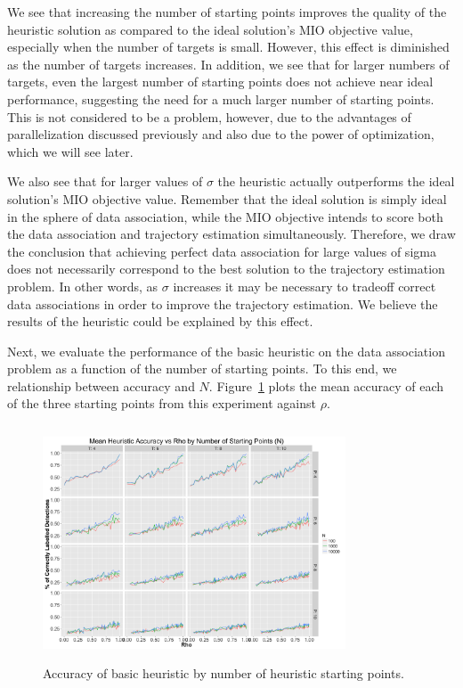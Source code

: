 \documentclass[journal]{IEEEtran}
\begin{document}
We see that increasing the number of starting points improves the quality of the heuristic solution as compared to the ideal solution's MIO objective value, especially when the number of targets is small. However, this effect is diminished as the number of targets increases. In addition, we see that for larger numbers of targets, even the largest number of starting points does not achieve near ideal performance, suggesting the need for a much larger number of starting points. This is not considered to be a problem, however, due to the advantages of parallelization discussed previously and also due to the power of optimization, which we will see later. 

We also see that for larger values of $\sigma$ the heuristic actually outperforms the ideal solution's MIO objective value. Remember that the ideal solution is simply ideal in the sphere of data association, while the MIO objective intends to score both the data association and trajectory estimation simultaneously. Therefore, we draw the conclusion that achieving perfect data association for large values of sigma does not necessarily correspond to the best solution to the trajectory estimation problem. In other words, as $\sigma$ increases it may be necessary to tradeoff correct data associations in order to improve the trajectory estimation. We believe the results of the heuristic could be explained by this effect.

Next, we evaluate the performance of the basic heuristic on the data association problem as a function of the number of starting points. To this end, we relationship between accuracy and $N$. Figure~\ref{fig:Basic_Heuristic_Accuracy} plots the mean accuracy of each of the three starting points from this experiment against $\rho$. 

\begin{figure}[h]
  \centering
  \includegraphics[width=9cm, height=7cm]{Basic_Heuristic_Accuracy}
  \caption{Accuracy of basic heuristic by number of heuristic starting points.}
  \label{fig:Basic_Heuristic_Accuracy}
\end{figure}
\end{document}
